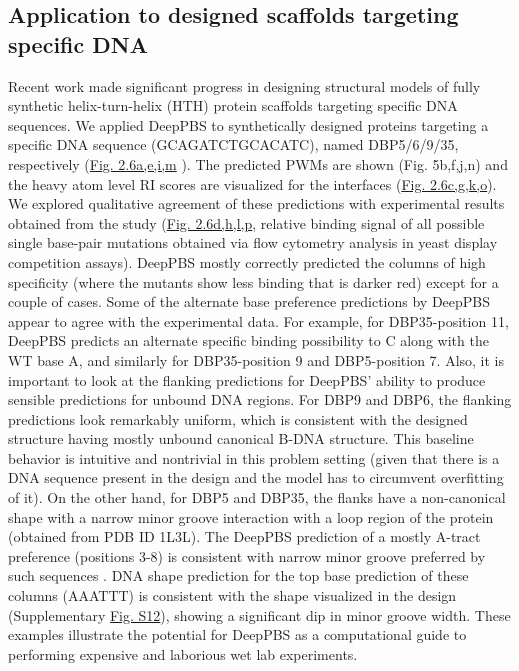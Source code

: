 \subsection{Application to designed scaffolds targeting specific DNA}
Recent work \citep{Glasscock2023} made significant progress in designing structural models of fully synthetic helix-turn-helix (HTH) protein scaffolds targeting specific DNA sequences. We applied DeepPBS to synthetically designed proteins targeting a specific DNA sequence (GCAGATCTGCACATC), named DBP5/6/9/35, respectively (\hyperref[fig:pdna5]{Fig. 2.6a,e,i,m} ). The predicted PWMs are shown (Fig. 5b,f,j,n) and the heavy atom level RI scores are visualized for the interfaces (\hyperref[fig:pdna5]{Fig. 2.6c,g,k,o}). We explored qualitative agreement of these predictions with experimental results obtained from the study (\hyperref[fig:pdna5]{Fig. 2.6d,h,l,p}, relative binding signal of all possible single base-pair mutations obtained via flow cytometry analysis \citep{Glasscock2023} in yeast display competition assays). DeepPBS mostly correctly predicted the columns of high specificity (where the mutants show less binding that is darker red) except for a couple of cases. Some of the alternate base preference predictions by DeepPBS appear to agree with the experimental data. For example, for DBP35-position 11, DeepPBS predicts an alternate specific binding possibility to C along with the WT base A, and similarly for DBP35-position 9 and DBP5-position 7. Also, it is important to look at the flanking predictions for DeepPBS’ ability to produce sensible predictions for unbound DNA regions. For DBP9 and DBP6, the flanking predictions look remarkably uniform, which is consistent with the designed structure having mostly unbound canonical B-DNA structure. This baseline behavior is intuitive and nontrivial in this problem setting (given that there is a DNA sequence present in the design and the model has to circumvent overfitting of it). On the other hand, for DBP5 and DBP35, the flanks have a non-canonical shape with a narrow minor groove interaction with a loop region of the protein (obtained from PDB ID 1L3L). The DeepPBS prediction of a mostly A-tract preference (positions 3-8) is consistent with narrow minor groove preferred by such sequences \citep{Stefl2004}. DNA shape prediction \citep{Li2023} for the top base prediction of these columns (AAATTT) is consistent with the shape visualized in the design (Supplementary \hyperref[fig:pdnaS12]{Fig. S12}), showing a significant dip in minor groove width. These examples illustrate the potential for DeepPBS as a computational guide to performing expensive and laborious wet lab experiments.
